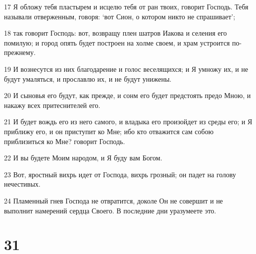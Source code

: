 \par 17 Я обложу тебя пластырем и исцелю тебя от ран твоих, говорит Господь. Тебя называли отверженным, говоря: `вот Сион, о котором никто не спрашивает';
\par 18 так говорит Господь: вот, возвращу плен шатров Иакова и селения его помилую; и город опять будет построен на холме своем, и храм устроится по-прежнему.
\par 19 И вознесутся из них благодарение и голос веселящихся; и Я умножу их, и не будут умаляться, и прославлю их, и не будут унижены.
\par 20 И сыновья его будут, как прежде, и сонм его будет предстоять предо Мною, и накажу всех притеснителей его.
\par 21 И будет вождь его из него самого, и владыка его произойдет из среды его; и Я приближу его, и он приступит ко Мне; ибо кто отважится сам собою приблизиться ко Мне? говорит Господь.
\par 22 И вы будете Моим народом, и Я буду вам Богом.
\par 23 Вот, яростный вихрь идет от Господа, вихрь грозный; он падет на голову нечестивых.
\par 24 Пламенный гнев Господа не отвратится, доколе Он не совершит и не выполнит намерений сердца Своего. В последние дни уразумеете это.

\chapter{31}

